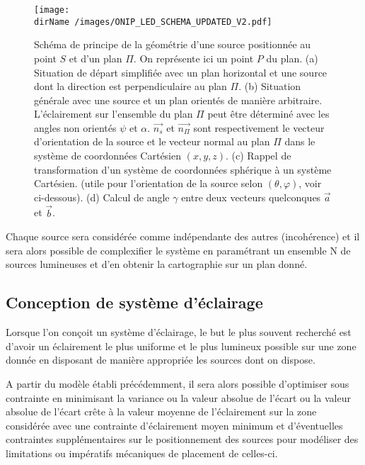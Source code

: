 \begin{figure}[h]
	\centering
	\texttt{[image: \\dirName /images/ONIP\_LED\_SCHEMA\_UPDATED\_V2.pdf]}
	\caption{Schéma de principe de la géométrie d'une source positionnée au point $S$ et d'un plan $\Pi$. On représente ici un point $P$ du plan.
	(a) Situation de départ simplifiée avec un plan horizontal et une source dont la direction est perpendiculaire au plan $\Pi$. 
	(b) Situation générale avec une source et un plan orientés de manière arbitraire. L'éclairement sur l'ensemble du plan $\Pi$ peut être déterminé avec les angles non orientés $\psi$ et $\alpha$. $\vec{n_s}$ et $\vec{n_\Pi}$ sont respectivement le vecteur d'orientation de la source et le vecteur normal au plan $\Pi$ dans le système de coordonnées Cartésien $(x, y, z)$. 
	(c) Rappel de transformation d'un système de coordonnées sphérique à un système Cartésien. (utile pour l'orientation de la source selon $(\theta, \varphi)$, voir ci-dessous). 
	(d) Calcul de angle $\gamma$ entre deux vecteurs quelconques $\vec{a}$ et $\vec{b}$.}
	\label{schema}
\end{figure}

Chaque source sera considérée comme indépendante des autres (incohérence) et il sera alors possible de complexifier le système en paramétrant un ensemble N de sources lumineuses et d'en obtenir la cartographie sur un plan donné.

\subsection{Conception de système d'éclairage}

Lorsque l'on conçoit un système d'éclairage, le but le plus souvent recherché est d'avoir un éclairement le plus uniforme et le plus lumineux possible sur une zone donnée en disposant de manière appropriée les sources dont on dispose. 

\medskip

A partir du modèle établi précédemment, il sera alors possible d'optimiser sous contrainte en minimisant la variance ou la valeur absolue de l'écart ou la valeur absolue de l'écart crête à la valeur moyenne de l'éclairement sur la zone considérée avec une contrainte d'éclairement moyen minimum et d'éventuelles contraintes supplémentaires sur le positionnement des sources pour modéliser des limitations ou impératifs mécaniques de placement de celles-ci.

